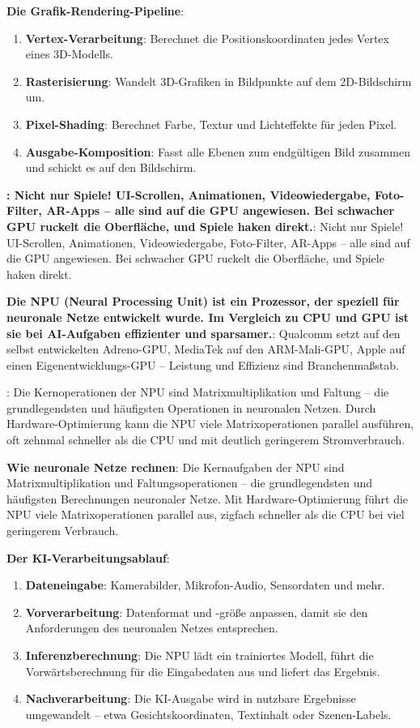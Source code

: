 \textbf{Die Grafik-Rendering-Pipeline}:

\begin{enumerate}
  \item \textbf{Vertex-Verarbeitung}: Berechnet die Positionskoordinaten jedes Vertex eines 3D-Modells.
  \item \textbf{Rasterisierung}: Wandelt 3D-Grafiken in Bildpunkte auf dem 2D-Bildschirm um.
  \item \textbf{Pixel-Shading}: Berechnet Farbe, Textur und Lichteffekte für jeden Pixel.
  \item \textbf{Ausgabe-Komposition}: Fasst alle Ebenen zum endgültigen Bild zusammen und schickt es auf den Bildschirm.
\end{enumerate}

\textbf{: Nicht nur Spiele! UI-Scrollen, Animationen, Videowiedergabe, Foto-Filter, AR-Apps – alle sind auf die GPU angewiesen. Bei schwacher GPU ruckelt die Oberfläche, und Spiele haken direkt.}: Nicht nur Spiele! UI-Scrollen, Animationen, Videowiedergabe, Foto-Filter, AR-Apps – alle sind auf die GPU angewiesen. Bei schwacher GPU ruckelt die Oberfläche, und Spiele haken direkt.

\textbf{Die NPU (Neural Processing Unit) ist ein Prozessor, der speziell für neuronale Netze entwickelt wurde. Im Vergleich zu CPU und GPU ist sie bei AI-Aufgaben effizienter und sparsamer.}: Qualcomm setzt auf den selbst entwickelten Adreno-GPU, MediaTek auf den ARM-Mali-GPU, Apple auf einen Eigenentwicklungs-GPU – Leistung und Effizienz sind Branchenmaßstab.


: Die Kernoperationen der NPU sind Matrixmultiplikation und Faltung – die grundlegendsten und häufigsten Operationen in neuronalen Netzen. Durch Hardware-Optimierung kann die NPU viele Matrixoperationen parallel ausführen, oft zehnmal schneller als die CPU und mit deutlich geringerem Stromverbrauch.

\textbf{Wie neuronale Netze rechnen}: Die Kernaufgaben der NPU sind Matrixmultiplikation und Faltungsoperationen – die grundlegendsten und häufigsten Berechnungen neuronaler Netze. Mit Hardware-Optimierung führt die NPU viele Matrixoperationen parallel aus, zigfach schneller als die CPU bei viel geringerem Verbrauch.

\textbf{Der KI-Verarbeitungsablauf}:

\begin{enumerate}
  \item \textbf{Dateneingabe}: Kamerabilder, Mikrofon-Audio, Sensordaten und mehr.
  \item \textbf{Vorverarbeitung}: Datenformat und -größe anpassen, damit sie den Anforderungen des neuronalen Netzes entsprechen.
  \item \textbf{Inferenzberechnung}: Die NPU lädt ein trainiertes Modell, führt die Vorwärtsberechnung für die Eingabedaten aus und liefert das Ergebnis.
  \item \textbf{Nachverarbeitung}: Die KI-Ausgabe wird in nutzbare Ergebnisse umgewandelt – etwa Gesichtskoordinaten, Textinhalt oder Szenen-Labels.
\end{enumerate}

